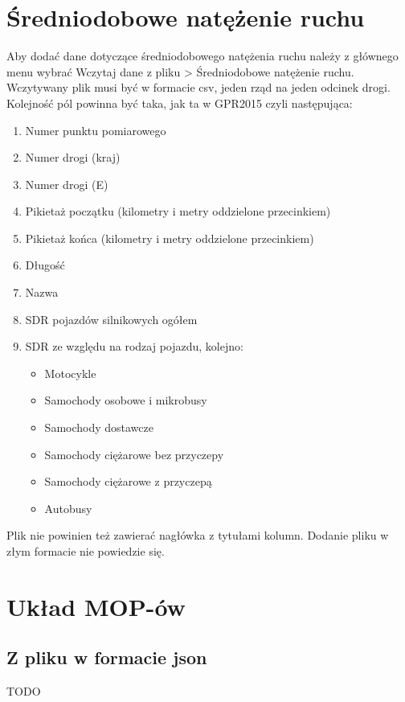 \documentclass[10pt,paper=a4 BCOR0, DIV15, titlepage=false, oneside]{scrbook} %
\begin{document}
      \section{Średniodobowe natężenie ruchu}
        Aby dodać dane dotyczące średniodobowego natężenia ruchu należy z
        głównego menu wybrać Wczytaj dane z pliku > Średniodobowe natężenie
        ruchu. Wczytywany plik musi być w formacie csv, jeden rząd na jeden
        odcinek drogi. Kolejność pól powinna być taka, jak ta w GPR2015 czyli następująca:
        \begin{enumerate}
          \item Numer punktu pomiarowego
          \item Numer drogi (kraj)
          \item Numer drogi (E)
          \item Pikietaż początku (kilometry i metry oddzielone przecinkiem)
          \item Pikietaż końca (kilometry i metry oddzielone przecinkiem)
          \item Długość
          \item Nazwa
          \item SDR pojazdów silnikowych ogółem 
          \item SDR ze względu na rodzaj pojazdu, kolejno:
          \begin{itemize}
            \item Motocykle
            \item Samochody osobowe i mikrobusy
            \item Samochody dostawcze
            \item Samochody ciężarowe bez przyczepy
            \item Samochody ciężarowe z przyczepą
            \item Autobusy 
          \end{itemize}
        \end{enumerate}
        Plik nie powinien też zawierać nagłówka z tytułami kolumn. Dodanie
        pliku w złym formacie nie powiedzie się.

        \section{Układ MOP-ów}
        \subsection{Z pliku w formacie json} TODO
\end{document}
